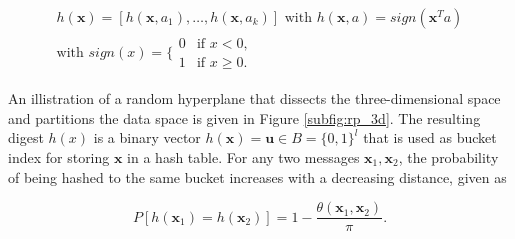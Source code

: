 \begin{gather}
    h(\bm{x}) = [h(\bm{x}, a_1), \dots, h(\bm{x}, a_k)] \text{ with } h(\bm{x}, a) = sign(\bm{x}^Ta) \\
    \text{with } sign(x) = \Biggl\{ \begin{array}{lc}
        0 & \text{if } x < 0, \\
        1 & \text{if } x \geq 0.
    \end{array}
\end{gather}

An illistration of a random hyperplane that dissects the three-dimensional space and partitions the data space is given in Figure \ref{subfig:rp_3d}. The resulting digest $h(x)$ is a binary vector $h(\bm{x}) = \bm{u} \in B = \{0, 1\}^l$ that is used as bucket index for storing $\bm{x}$ in a hash table. For any two messages $\bm{x}_1, \bm{x}_2$, the probability of being hashed to the same bucket increases with a decreasing distance, given as

\begin{equation}\label{eq:rp_proba}
    P[h(\bm{x}_1) = h(\bm{x}_2)] = 1 - \frac{\theta(\bm{x}_1, \bm{x}_2)}{\pi}.
\end{equation}

